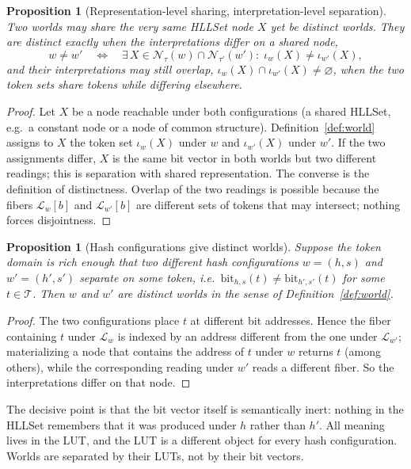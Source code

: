 \documentclass[11pt,a4paper]{article}
\newtheorem{proposition}[theorem]{Proposition}
\theoremstyle{remark}
\newcommand{\Tok}{\ensuremath{\mathcal{T}}}         %
\newcommand{\Lut}{\ensuremath{\mathcal{L}}}         %
\newcommand{\iotaw}{\ensuremath{\iota_{w}}}         %
\begin{document}
\begin{proposition}[Representation-level sharing, interpretation-level separation]
\label{prop:twolevels}
Two worlds may share the very same HLLSet node $X$ yet be distinct worlds.
They are distinct exactly when the interpretations differ on a shared node,
\begin{equation}
  w\neq w' \quad\Longleftrightarrow\quad
  \exists\,X\in\mathcal{N}_\tau(w)\cap\mathcal{N}_{\tau'}(w'):
  \;\iotaw(X)\neq\iota_{w'}(X),
\end{equation}
and their interpretations may still overlap,
$\iotaw(X)\cap\iota_{w'}(X)\neq\varnothing$, when the two token sets share
tokens while differing elsewhere.
\end{proposition}

\begin{proof}
Let $X$ be a node reachable under both configurations (a shared HLLSet, e.g.\ a
constant node or a node of common structure). Definition~\ref{def:world}
assigns to $X$ the token set $\iotaw(X)$ under $w$ and $\iota_{w'}(X)$ under
$w'$. If the two assignments differ, $X$ is the same bit vector in both worlds
but two different readings; this is separation with shared representation. The
converse is the definition of distinctness. Overlap of the two readings is
possible because the fibers $\Lut_w[b]$ and $\Lut_{w'}[b]$ are different sets of
tokens that may intersect; nothing forces disjointness.
\end{proof}

\begin{proposition}[Hash configurations give distinct worlds]
\label{prop:distinct}
Suppose the token domain is rich enough that two different hash configurations
$w=(h,s)$ and $w'=(h',s')$ separate on some token, i.e.\
$\mathrm{bit}_{h,s}(t)\neq\mathrm{bit}_{h',s'}(t)$ for some $t\in\Tok$. Then
$w$ and $w'$ are distinct worlds in the sense of Definition~\ref{def:world}.
\end{proposition}

\begin{proof}
The two configurations place $t$ at different bit addresses. Hence the fiber
containing $t$ under $\Lut_w$ is indexed by an address different from the one
under $\Lut_{w'}$; materializing a node that contains the address of $t$ under
$w$ returns $t$ (among others), while the corresponding reading under $w'$
reads a different fiber. So the interpretations differ on that node.
\end{proof}

The decisive point is that the bit vector itself is semantically inert: nothing
in the HLLSet remembers that it was produced under $h$ rather than $h'$. All
meaning lives in the LUT, and the LUT is a different object for every hash
configuration. Worlds are separated by their LUTs, not by their bit vectors.
\end{document}
